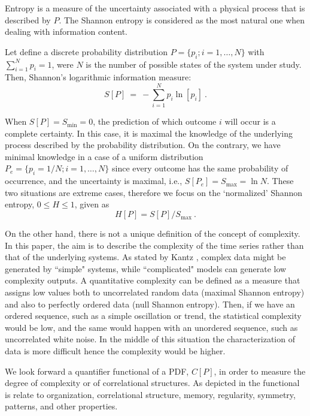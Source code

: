 Entropy is a measure of the uncertainty associated with a physical process that is described by $P$.
The Shannon entropy is considered as the most natural one \cite{Shannon1948} when dealing with information content.

Let define a discrete probability distribution $P=\{p_i; i=1,\ldots, N\}$ with $\sum_{i=1}^N p_i = 1$, were $N$ is the number of possible states of the system under study.
Then, Shannon's logarithmic information measure:
\begin{equation}
\label{Shannon-disc}
S[P] ~=~ -\sum_{i=1}^{N} p_i \ln \left[ p_i \right] \ .
\end{equation}

When $S[P] = S_{\min} = 0$, the prediction of which outcome $i$ will occur is a complete certainty.
In this case, it is maximal the knowledge of the underlying process described by the probability distribution.
On the contrary, we have minimal knowledge in a case of a uniform distribution $P_e = \{ p_i = 1/N; i=1, \ldots , N \}$ since every outcome has the same probability of occurrence, and the uncertainty is maximal, i.e., $S[P_e] = S_{\max} = \ln N$.
These two situations are extreme cases, therefore we focus on the `normalized' Shannon entropy, $0 \leq H \leq 1$, given as
\begin{equation}
\label{shannon-disc-normalizada}
H[P] = S[P] / S_{\max} \ .
\end{equation}

On the other hand, there is not a unique definition of the concept of complexity.
In this paper, the aim is to describe the complexity of the time series rather than that of the underlying systems.
As stated by Kantz \cite{Kantz1998}, complex data might be generated by ``simple" systems, while ``complicated" models can generate low complexity outputs.
A quantitative complexity can be defined as a measure that assigns low values both to uncorrelated random data (maximal Shannon entropy) and also to perfectly ordered data (null Shannon entropy).
Then, if we have an ordered sequence, such as a simple oscillation or trend, the statistical complexity would be low, and the same would happen with an unordered sequence, such as uncorrelated white noise.
In the middle of this situation the characterization of data is more difficult hence the complexity would be higher.

We look forward a quantifier functional of a PDF, $C[P]$, in order to measure the degree  of complexity or of correlational structures.  
As depicted in \cite{Feldman2008} the functional is relate to organization, correlational structure, memory, regularity, symmetry, patterns, and other properties.

